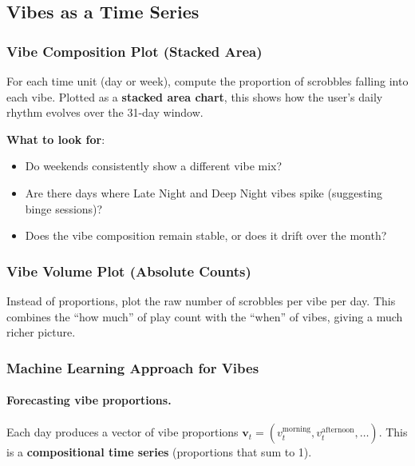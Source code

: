 \documentclass[12pt, a4paper]{article}
\begin{document}
\subsection{Vibes as a Time Series}

\subsubsection{Vibe Composition Plot (Stacked Area)}
For each time unit (day or week), compute the proportion of scrobbles falling
into each vibe. Plotted as a \textbf{stacked area chart}, this shows how the
user's daily rhythm evolves over the 31-day window.

\textbf{What to look for}:
\begin{itemize}
    \item Do weekends consistently show a different vibe mix?
    \item Are there days where Late Night and Deep Night vibes spike
          (suggesting binge sessions)?
    \item Does the vibe composition remain stable, or does it drift over
          the month?
\end{itemize}

\subsubsection{Vibe Volume Plot (Absolute Counts)}
Instead of proportions, plot the raw number of scrobbles per vibe per day.
This combines the ``how much'' of play count with the ``when'' of vibes,
giving a much richer picture.

\subsubsection{Machine Learning Approach for Vibes}

\paragraph{Forecasting vibe proportions.}
Each day produces a vector of vibe proportions
$\mathbf{v}_t = (v_t^{\text{morning}}, v_t^{\text{afternoon}}, \ldots)$.
This is a \textbf{compositional time series} (proportions that sum to 1).
\end{document}
